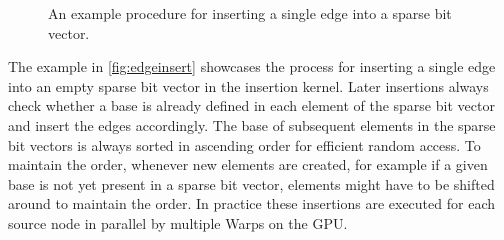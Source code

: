 \begin{figure}
\begin{center}
    \end{center}
    \caption{An example procedure for inserting a single edge into a sparse bit vector.}
    \label{fig:edgeinsert}
\end{figure}
The example in \autoref{fig:edgeinsert} showcases the process for inserting a single edge into an empty sparse bit vector in the insertion kernel.
Later insertions always check whether a base is already defined in each element of the sparse bit vector and insert the edges accordingly.
The base of subsequent elements in the sparse bit vectors is always sorted in ascending order for efficient random access. To maintain the order, whenever new elements are created, for example if a given base is not yet present in a sparse bit vector, elements might have to be shifted around to maintain the order.
In practice these insertions are executed for each source node in parallel by multiple Warps on the GPU.

